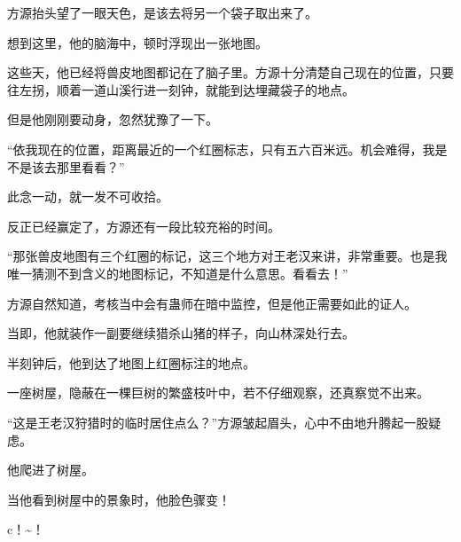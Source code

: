 \begin{this_body}
方源抬头望了一眼天色，是该去将另一个袋子取出来了。

想到这里，他的脑海中，顿时浮现出一张地图。

这些天，他已经将兽皮地图都记在了脑子里。方源十分清楚自己现在的位置，只要往左拐，顺着一道山溪行进一刻钟，就能到达埋藏袋子的地点。

但是他刚刚要动身，忽然犹豫了一下。

“依我现在的位置，距离最近的一个红圈标志，只有五六百米远。机会难得，我是不是该去那里看看？”

此念一动，就一发不可收拾。

反正已经赢定了，方源还有一段比较充裕的时间。

“那张兽皮地图有三个红圈的标记，这三个地方对王老汉来讲，非常重要。也是我唯一猜测不到含义的地图标记，不知道是什么意思。看看去！”

方源自然知道，考核当中会有蛊师在暗中监控，但是他正需要如此的证人。

当即，他就装作一副要继续猎杀山猪的样子，向山林深处行去。

半刻钟后，他到达了地图上红圈标注的地点。

一座树屋，隐蔽在一棵巨树的繁盛枝叶中，若不仔细观察，还真察觉不出来。

“这是王老汉狩猎时的临时居住点么？”方源皱起眉头，心中不由地升腾起一股疑虑。

他爬进了树屋。

当他看到树屋中的景象时，他脸色骤变！

c！\~{}！

\end{this_body}

